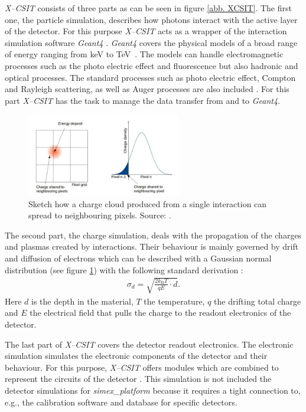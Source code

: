 \textit{X--CSIT} consists of three parts \cite{Joy2015} as can be seen in figure
\ref{abb. XCSIT}. The first one, the particle simulation, describes how
photons interact with the active layer of the detector. For this purpose
\textit{X--CSIT} acts as a wrapper of the interaction simulation software
\textit{Geant4} \cite{Joy2015}. \textit{Geant4} covers the physical models of a
broad range of energy ranging from \si{\kilo\electronvolt} to
\si{\tera\electronvolt}~\cite{agostinelli2003geant4}. The
models can handle electromagnetic processes such as the photo electric
effect and fluorescence but also hadronic and optical processes. The standard
processes such as photo electric effect, Compton and Rayleigh scattering, as well
as Auger processes are also included \cite{Joy2015,agostinelli2003geant4}.
For this part \textit{X--CSIT} has the task to
manage the data transfer from and to \textit{Geant4}.
%
\begin{figure}
  \centering
  \includegraphics[width=0.6\textwidth]{figures/ChargeSpread.png}
  \caption{Sketch how a charge cloud produced from a single interaction can
    spread to neighbouring pixels. Source: \cite{Joy2015}.}
  \label{abb. Spread}
\end{figure}
%
The second part, the charge simulation, deals with the propagation of the
charges and plasmas created by interactions. Their behaviour is mainly governed
by drift and diffusion of electrons which can be described with a Gaussian
normal distribution (see figure \ref{abb. Spread}) with the following standard
derivation \cite{Joy2015}:
%
\begin{align}
  \sigma_{d} = \sqrt{\frac{2k_{\text{B}} T}{q E} \cdot d}.
\end{align}
%
Here $d$ is the depth in the material, $T$ the temperature, $q$ the drifting
total charge and $E$ the electrical field that pulls the charge to the readout
electronics of the detector.

The last part of \textit{X--CSIT} covers the detector readout electronics.
The electronic simulation simulates the electronic components of the detector
and their behaviour. For this purpose, \textit{X--CSIT} offers modules which are
combined to represent the circuits of the detector \cite{Joy2015}. This
simulation is not included the detector simulations for \textit{simex\_platform} because it
requires a tight connection to, e.g., the calibration software and database for
specific detectors.
%
